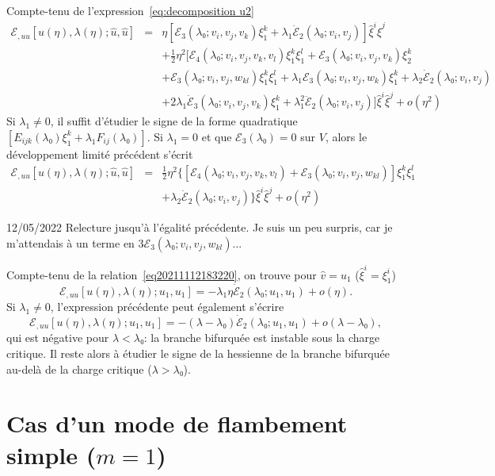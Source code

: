 \documentclass{article}
\newcommand{\textdots}{...}
\begin{document}
Compte-tenu de l'expression~\eqref{eq:decomposition u2}
\begin{eqnarray}
  ℰ_{, u  u} [u (η), λ (η) ; \hat{u}, \hat{u}] &
  = & η [ℰ_3 (λ₀ ; v_i, v_j, v_k) ξ_1^k + λ_1
  \dot{ℰ}_2 (λ₀ ; v_i, v_j)]  \hat{ξ}^i  \hat{ξ}^j
  \nonumber\\
  &  & + \tfrac{1}{2} η^2  [ℰ_4 (λ₀ ; v_i, v_j, v_k, v_l)
  ξ_1^k ξ_1^l +ℰ_3 (λ₀ ; v_i, v_j, v_k) ξ_2^k
   \nonumber\\
  &  & +ℰ_3 (λ₀ ; v_i, v_j, w_{k  l}) ξ_1^k
  ξ_1^l + λ_1 ℰ_3 (λ₀ ; v_i, v_j, w_k) ξ_1^k +
  λ_2  \dot{ℰ}_2 (λ₀ ; v_i, v_j) \nonumber\\
  &  &  + 2 λ_1  \dot{ℰ}_3 (λ₀ ; v_i, v_j,
  v_k) ξ_1^k + λ_1^2  \ddot{ℰ}_2 (λ₀ ; v_i, v_j)]
  \hat{ξ}^i  \hat{ξ}^j + o (η^2) \nonumber
\end{eqnarray}
Si $λ_1 \neq 0$, il suffit d'étudier le signe de la forme
quadratique $[E_{i  j  k} (λ₀) ξ_1^k + λ_1 F_{i
 j} (λ₀)] .$ Si $λ_1 = 0$ et que $ℰ_3
(λ₀) = 0$ sur $V$, alors le développement limité
précédent s'écrit
\begin{eqnarray}
  ℰ_{, u  u} [u (η), λ (η) ; \hat{u}, \hat{u}] &
  = & \tfrac{1}{2} η^2  \{ [ℰ_4 (λ₀ ; v_i, v_j, v_k, v_l)
   +ℰ_3 (λ₀ ; v_i, v_j, w_{k  l})] ξ_1^k
  ξ_1^l \nonumber\\
  &  & +  λ_2  \dot{ℰ}_2 (λ₀ ; v_i, v_j) \}
  \hat{ξ}^i  \hat{ξ}^j + o (η^2) \nonumber
\end{eqnarray}
\begin{tmframed}
  12/05/2022 Relecture jusqu'à l'égalité précédente. Je
  suis un peu surpris, car je m'attendais à un terme en $3ℰ_3
  (λ₀ ; v_i, v_j, w_{k  l})${\textdots}
\end{tmframed}

Compte-tenu de la relation~\eqref{eq20211112183220}, on trouve pour $\hat{v} =
u_1$ ($\hat{ξ}^i = ξ_1^i$)
\begin{equation}
  ℰ_{, u  u} [u (η), λ (η) ; u_1, u_1] = -
  λ_1 η \dot{ℰ}_2 (λ₀ ; u_1, u_1) + o (η) .
\end{equation}
Si $λ_1 \neq 0$, l'expression précédente peut également
s'écrire
\begin{equation}
  ℰ_{, u  u} [u (η), λ (η) ; u_1, u_1] = -
  (λ - λ₀)  \dot{ℰ}_2 (λ₀ ; u_1, u_1) + o
  (λ - λ₀),
\end{equation}
qui est négative pour $λ < λ₀$: la branche bifurquée est
instable sous la charge critique. Il reste alors à étudier le signe de
la hessienne de la branche bifurquée au-delà de la charge critique
($λ > λ₀$).

\section{Cas d'un mode de flambement simple ($m = 1$)}
\end{document}
